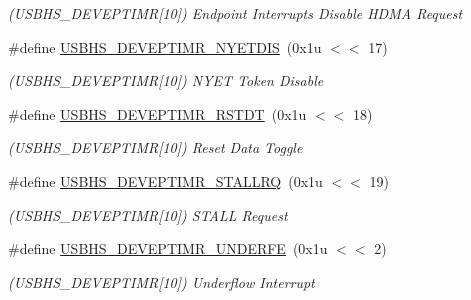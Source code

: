\begin{DoxyCompactItemize}
\begin{DoxyCompactList}\small\item\em (U\+S\+B\+H\+S\+\_\+\+D\+E\+V\+E\+P\+T\+I\+MR\mbox{[}10\mbox{]}) Endpoint Interrupts Disable H\+D\+MA Request \end{DoxyCompactList}\item 
\mbox{\label{group__SAMS70__USBHS_ga2b8ab726559173db686c4ed894e4d675}} 
\#define \mbox{\hyperlink{group__SAMS70__USBHS_ga2b8ab726559173db686c4ed894e4d675}{U\+S\+B\+H\+S\+\_\+\+D\+E\+V\+E\+P\+T\+I\+M\+R\+\_\+\+N\+Y\+E\+T\+D\+IS}}~(0x1u $<$$<$ 17)
\begin{DoxyCompactList}\small\item\em (U\+S\+B\+H\+S\+\_\+\+D\+E\+V\+E\+P\+T\+I\+MR\mbox{[}10\mbox{]}) N\+Y\+ET Token Disable \end{DoxyCompactList}\item 
\mbox{\label{group__SAMS70__USBHS_ga857d36877d31b2b9b4674812680e0127}} 
\#define \mbox{\hyperlink{group__SAMS70__USBHS_ga857d36877d31b2b9b4674812680e0127}{U\+S\+B\+H\+S\+\_\+\+D\+E\+V\+E\+P\+T\+I\+M\+R\+\_\+\+R\+S\+T\+DT}}~(0x1u $<$$<$ 18)
\begin{DoxyCompactList}\small\item\em (U\+S\+B\+H\+S\+\_\+\+D\+E\+V\+E\+P\+T\+I\+MR\mbox{[}10\mbox{]}) Reset Data Toggle \end{DoxyCompactList}\item 
\mbox{\label{group__SAMS70__USBHS_ga9303a4c0d94535f879eec79d44321a5f}} 
\#define \mbox{\hyperlink{group__SAMS70__USBHS_ga9303a4c0d94535f879eec79d44321a5f}{U\+S\+B\+H\+S\+\_\+\+D\+E\+V\+E\+P\+T\+I\+M\+R\+\_\+\+S\+T\+A\+L\+L\+RQ}}~(0x1u $<$$<$ 19)
\begin{DoxyCompactList}\small\item\em (U\+S\+B\+H\+S\+\_\+\+D\+E\+V\+E\+P\+T\+I\+MR\mbox{[}10\mbox{]}) S\+T\+A\+LL Request \end{DoxyCompactList}\item 
\mbox{\label{group__SAMS70__USBHS_ga36687100163c9ee32cdf3da0cd3d1bb8}} 
\#define \mbox{\hyperlink{group__SAMS70__USBHS_ga36687100163c9ee32cdf3da0cd3d1bb8}{U\+S\+B\+H\+S\+\_\+\+D\+E\+V\+E\+P\+T\+I\+M\+R\+\_\+\+U\+N\+D\+E\+R\+FE}}~(0x1u $<$$<$ 2)
\begin{DoxyCompactList}\small\item\em (U\+S\+B\+H\+S\+\_\+\+D\+E\+V\+E\+P\+T\+I\+MR\mbox{[}10\mbox{]}) Underflow Interrupt \end{DoxyCompactList}\item 

\end{DoxyCompactItemize}
